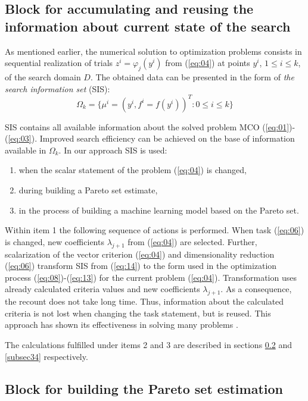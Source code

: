 \documentclass[runningheads]{llncs}
\begin{document}
\subsection{Block for accumulating and reusing the information about current state of the search}
\label{subsec32}

As mentioned earlier, the numerical solution to optimization problems consists in sequential realization of trials $z^i=\varphi_j (y^i)$ from (\ref{eq:04}) at points $y^i$, $1 \leq i \leq k$, of the search domain $D$. The obtained data can be presented in the form of \textit{the search information set} (SIS):
\begin{equation}
    \label{eq:14}
    \Omega_k=\{\mu^i=(y^i,f^i=f(y^i))^T: 0 \leq i \leq k\}
\end{equation}

SIS contains all available information about the solved problem MCO (\ref{eq:01})-(\ref{eq:03}). Improved search efficiency can be achieved on the base of information available in $\Omega_k$. In our approach SIS is used:
\begin{enumerate}
	\item	when the scalar statement of the problem (\ref{eq:04}) is changed,
	\item	during building a Pareto set estimate, 
	\item	in the process of building a machine learning model based on the Pareto set.
\end{enumerate}

Within item 1 the following sequence of actions is performed. When task (\ref{eq:06}) is changed, new coefficients $\lambda_{j+1}$ from (\ref{eq:04}) are selected. Further, scalarization of the vector criterion (\ref{eq:04}) and dimensionality reduction (\ref{eq:06}) transform SIS from (\ref{eq:14}) to the form used in the optimization process (\ref{eq:08})-(\ref{eq:13}) for the current problem (\ref{eq:04}). Transformation uses already calculated criteria values and new coefficients $\lambda_{j+1}$. As a consequence, the recount does not take long time. Thus, information about the calculated criteria is not lost when changing the task statement, but is reused. This approach has shown its effectiveness in solving many problems \cite{Konnov2025,Gergel2018,GergelKozinov2020}.

The calculations fulfilled under items 2 and 3 are described in sections \ref{subsec33} and \ref{subsec34} respectively.

\subsection{Block for building the Pareto set estimation}
\label{subsec33}
\end{document}
